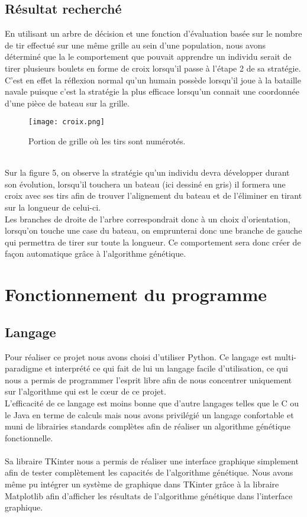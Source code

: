 \documentclass[12pt]{report}
\begin{document}
	\subsection{Résultat recherché}
	En utilisant un arbre de décision et une fonction d'évaluation basée sur le nombre de tir effectué sur une même grille au sein d'une population, nous avons déterminé que la le comportement que pouvait apprendre un individu serait de tirer plusieurs boulets en forme de croix lorsqu'il passe à l'étape 2 de sa stratégie.\\
	C'est en effet la réflexion normal qu'un humain possède lorsqu'il joue à la bataille navale puisque c'est la stratégie la plus efficace lorsqu'un connait une coordonnée d'une pièce de bateau sur la grille.
	\begin{figure}[h]
    	\begin{center}
		\texttt{[image: croix.png]}
		\caption{Portion de grille où les tirs sont numérotés.}
		\end{center}
	\end{figure}
	\\Sur la figure 5, on observe la stratégie qu'un individu devra développer durant son évolution, lorsqu'il touchera un bateau (ici dessiné en gris) il formera une croix avec ses tirs afin de trouver l'alignement du bateau et de l'éliminer en tirant sur la longueur de celui-ci.\\
	Les branches de droite de l'arbre correspondrait donc à un choix d'orientation, lorsqu'on touche une case du bateau, on emprunterai donc une branche de gauche qui permettra de tirer sur toute la longueur. Ce comportement sera donc créer de façon automatique grâce à l'algorithme génétique.
\newpage
{}
\section{Fonctionnement du programme}
	\subsection{Langage}
	Pour réaliser ce projet nous avons choisi d'utiliser Python. Ce langage est multi-paradigme et interprété ce qui fait de lui un langage facile d'utilisation, ce qui nous a permis de programmer l'esprit libre afin de nous concentrer uniquement sur l'algorithme qui est le cœur de ce projet.\\
	L'efficacité de ce langage est moins bonne que d'autre langages telles que le C ou le Java en terme de calculs mais nous avons privilégié un langage confortable et muni de librairies standards complètes afin de réaliser un algorithme génétique fonctionnelle.\\\\
	Sa libraire TKinter nous a permis de réaliser une interface graphique simplement afin de tester complètement les capacités de l'algorithme génétique. Nous avons même pu intégrer un système de graphique dans TKinter grâce à la libraire Matplotlib afin d'afficher les résultats de l'algorithme génétique dans l'interface graphique.
\end{document}
